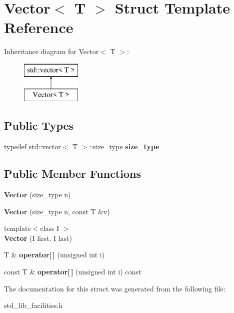 \hypertarget{struct_vector}{\section{Vector$<$ T $>$ Struct Template Reference}
\label{struct_vector}
}
Inheritance diagram for Vector$<$ T $>$\-:\begin{figure}[H]
\begin{center}
\leavevmode
\includegraphics[height=2.000000cm]{struct_vector}
\end{center}
\end{figure}
\subsection*{Public Types}
\begin{DoxyCompactItemize}
\item 
\hypertarget{struct_vector_a0a224b1b922f15fc934174ba80e607c3}{typedef std\-::vector$<$ T $>$\-::size\-\_\-type {\bfseries size\-\_\-type}}\label{struct_vector_a0a224b1b922f15fc934174ba80e607c3}

\end{DoxyCompactItemize}
\subsection*{Public Member Functions}
\begin{DoxyCompactItemize}
\item 
\hypertarget{struct_vector_ac3c80bdb9f1bea80cd6402b8dbaa6b9d}{{\bfseries Vector} (size\-\_\-type n)}\label{struct_vector_ac3c80bdb9f1bea80cd6402b8dbaa6b9d}

\item 
\hypertarget{struct_vector_a2aeb4de13b17cc5ae684d03ae55d575d}{{\bfseries Vector} (size\-\_\-type n, const T \&v)}\label{struct_vector_a2aeb4de13b17cc5ae684d03ae55d575d}

\item 
\hypertarget{struct_vector_a4f59bd4bba10d10aee08dd1cb27ec63e}{{\footnotesize template$<$class I $>$ }\\{\bfseries Vector} (I first, I last)}\label{struct_vector_a4f59bd4bba10d10aee08dd1cb27ec63e}

\item 
\hypertarget{struct_vector_aeb661214adc4e3da69a126ce9d4abcee}{T \& {\bfseries operator\mbox{[}$\,$\mbox{]}} (unsigned int i)}\label{struct_vector_aeb661214adc4e3da69a126ce9d4abcee}

\item 
\hypertarget{struct_vector_a92c85065b1cd57d47ec3476cc13b992b}{const T \& {\bfseries operator\mbox{[}$\,$\mbox{]}} (unsigned int i) const }\label{struct_vector_a92c85065b1cd57d47ec3476cc13b992b}

\end{DoxyCompactItemize}


The documentation for this struct was generated from the following file\-:\begin{DoxyCompactItemize}
\item 
std\-\_\-lib\-\_\-facilities.\-h\end{DoxyCompactItemize}

